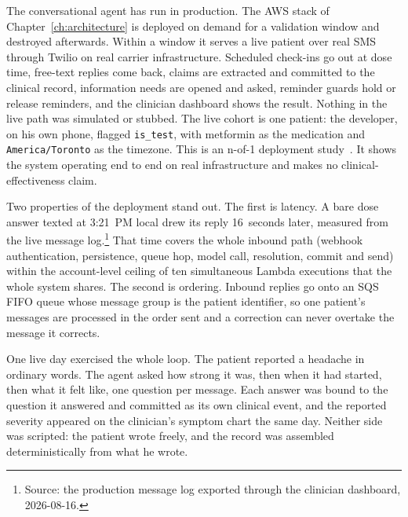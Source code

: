 The conversational agent has run in production. The AWS stack of
Chapter~\ref{ch:architecture} is deployed on demand for a validation window and
destroyed afterwards. Within a window it serves a live patient over real SMS
through Twilio on real carrier infrastructure. Scheduled check-ins go out at dose
time, free-text replies come back, claims are extracted and committed to the
clinical record, information needs are opened and asked, reminder guards hold or
release reminders, and the clinician dashboard shows the result. Nothing in the
live path was simulated or stubbed. The live cohort is one patient: the
developer, on his own phone, flagged \texttt{is\_test}, with metformin as the
medication and \texttt{America/Toronto} as the timezone. This is an n-of-1
deployment study~\cite{vohra2015cent}. It shows the system operating end to end
on real infrastructure and makes no clinical-effectiveness claim.

Two properties of the deployment stand out. The first is latency. A bare dose
answer texted at 3:21~PM local drew its reply 16~seconds later, measured from the
live message log.\footnote{Source: the production message log exported through
the clinician dashboard, 2026-08-16.} That time covers the whole inbound path
(webhook authentication, persistence, queue hop, model call, resolution, commit
and send) within the account-level ceiling of ten simultaneous Lambda executions
that the whole system shares. The second is ordering. Inbound replies go onto an
SQS FIFO queue whose message group is the patient identifier, so one patient's
messages are processed in the order sent and a correction can never overtake the
message it corrects.

One live day exercised the whole loop. The patient reported a headache in
ordinary words. The agent asked how strong it was, then when it had started,
then what it felt like, one question per message. Each answer was bound to the
question it answered and committed as its own clinical event, and the reported
severity appeared on the clinician's symptom chart the same day. Neither side
was scripted: the patient wrote freely, and the record was assembled
deterministically from what he wrote.
